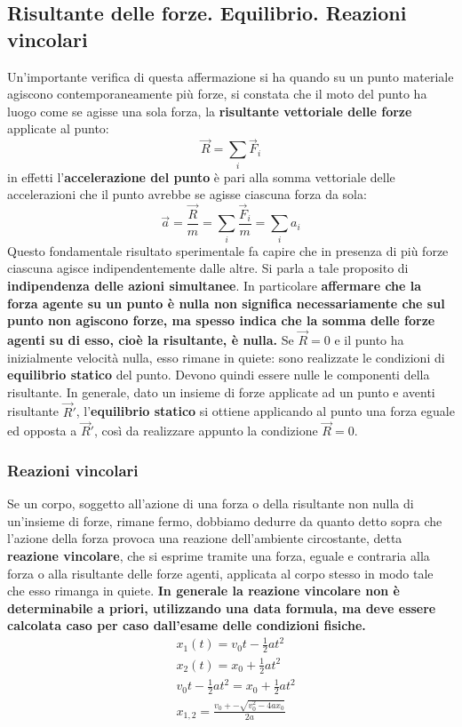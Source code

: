 \documentclass{article}
\numberwithin{equation}{subsection}
\begin{document}
\subsection{Risultante delle forze. Equilibrio. Reazioni vincolari}
Un'importante verifica di questa affermazione si ha quando su un punto materiale agiscono contemporaneamente più forze, si constata che il moto del punto ha luogo come se agisse una sola forza, la \textbf{risultante vettoriale delle forze} applicate al punto:
\begin{equation}
    \vec{R} = \sum_i \vec{F}_i
    \end{equation}
in effetti l'\textbf{accelerazione del punto} è pari alla somma vettoriale delle accelerazioni che il punto avrebbe se agisse ciascuna forza da sola:
\begin{equation}
    \vec{a}=\frac{\vec{R}}{m}=\sum_i\frac{\vec{F}_i}{m}=\sum_ia_i
\end{equation}
Questo fondamentale risultato sperimentale fa capire che in presenza di più forze ciascuna agisce indipendentemente dalle altre. Si parla a tale proposito di \textbf{indipendenza delle azioni simultanee}. In particolare \textbf{affermare che la forza agente su un punto è nulla non significa necessariamente che sul punto non agiscono forze, ma spesso indica che la somma delle forze agenti su di esso, cioè la risultante, è nulla.} Se $\vec{R}=0$ e il punto ha inizialmente velocità nulla, esso rimane in quiete: sono realizzate le condizioni di \textbf{equilibrio statico} del punto. Devono quindi essere nulle le componenti della risultante. In generale, dato un insieme di forze applicate ad un punto e aventi risultante $\vec{R}'$, l'\textbf{equilibrio statico} si ottiene applicando al punto una forza eguale ed opposta a $\vec{R}'$, così da realizzare appunto la condizione $\vec{R}=0$.
\subsubsection{Reazioni vincolari}
Se un corpo, soggetto all'azione di una forza o della risultante non nulla di un'insieme di forze, rimane fermo, dobbiamo dedurre da quanto detto sopra che l'azione della forza provoca una reazione dell'ambiente circostante, detta \textbf{reazione vincolare}, che si esprime tramite una forza, eguale e contraria alla forza o alla risultante delle forze agenti, applicata al corpo stesso in modo tale che esso rimanga in quiete. \textbf{In generale la reazione vincolare non è determinabile a priori, utilizzando una data formula, ma deve essere calcolata caso per caso dall'esame delle condizioni fisiche.}
\begin{align}
    & x_1(t)=v_0t - \frac{1}{2}at^2 \\
    & x_2(t)=x_0+\frac{1}{2}at^2 \\
    & v_0t - \frac{1}{2}at^2=x_0+\frac{1}{2}at^2 \\
    & x_{1,2}= \frac{v_0+-\sqrt{v_0^2-4ax_0}}{2a}
\end{align}
\end{document}
